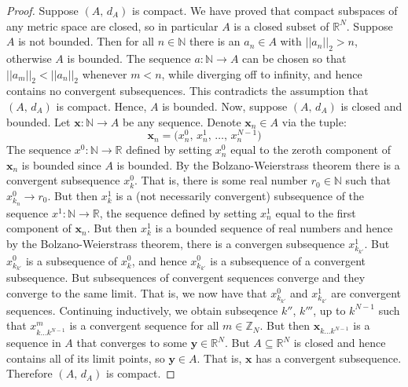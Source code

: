 \documentclass{article}
\theoremstyle{plain}
\theoremstyle{normal}
\begin{document}
        \begin{proof}
            Suppose $(A,\,d_{A})$ is compact. We have proved that compact
            subspaces of any metric space are closed, so in particular
            $A$ is a closed subset of $\mathbb{R}^{N}$. Suppose $A$ is not
            bounded. Then for all $n\in\mathbb{N}$ there is an
            $a_{n}\in{A}$ with $||a_{n}||_{2}>n$, otherwise
            $A$ is bounded. The sequence $a:\mathbb{N}\rightarrow{A}$ can be
            chosen so that $||a_{m}||_{2}<||a_{n}||_{2}$ whenever $m<n$, while
            diverging off to infinity, and hence contains no
            convergent subsequences. This contradicts the assumption that
            $(A,\,d_{A})$ is compact. Hence, $A$ is bounded. Now, suppose
            $(A,\,d_{A})$ is closed and bounded. Let
            $\mathbf{x}:\mathbb{N}\rightarrow{A}$ be any sequence. Denote
            $\mathbf{x}_{n}\in{A}$ via the tuple:
            \begin{equation}
                \mathbf{x}_{n}=\big(x_{n}^{0},\,x_{n}^{1},\,\dots,\,
                    x_{n}^{N-1}\big)
            \end{equation}
            The sequence $x^{0}:\mathbb{N}\rightarrow\mathbb{R}$ defined by
            setting $x_{n}^{0}$ equal to the zeroth component of
            $\mathbf{x}_{n}$ is bounded since $A$ is bounded. By
            the Bolzano-Weierstrass theorem there is a
            convergent subsequence $x_{k}^{0}$. That is, there is some
            real number $r_{0}\in\mathbb{N}$ such that
            $x_{k_{n}}^{0}\rightarrow{r}_{0}$. But then
            $x_{k}^{1}$ is a (not necessarily convergent) subsequence of the
            sequence $x^{1}:\mathbb{N}\rightarrow\mathbb{R}$, the sequence
            defined by setting $x_{n}^{1}$ equal to the first component of
            $\mathbf{x}_{n}$. But then $x_{k}^{1}$ is a bounded sequence of
            real numbers and hence by the Bolzano-Weierstrass theorem, there
            is a convergen subsequence $x_{k_{k'}}^{1}$. But
            $x_{k_{k'}}^{0}$ is a subsequence of $x_{k}^{0}$, and hence
            $x_{k_{k'}}^{0}$ is a subsequence of a convergent subsequence.
            But subsequences of convergent sequences converge and they converge
            to the same limit. That is, we now have that
            $x_{k_{k'}}^{0}$ and $x_{k_{k'}}^{1}$ are convergent sequences.
            Continuing inductively, we obtain subseqence
            $k''$, $k'''$, up to $k^{N-1}$ such that
            $x_{k\dots{k}^{N-1}}^{m}$ is a convergent sequence for all
            $m\in\mathbb{Z}_{N}$. But then
            $\mathbf{x}_{k\dots{k}^{N-1}}$ is a sequence in $A$ that converges
            to some $\mathbf{y}\in\mathbb{R}^{N}$. But
            $A\subseteq\mathbb{R}^{N}$ is closed and hence contains all of its
            limit points, so $\mathbf{y}\in{A}$. That is, $\mathbf{x}$ has a
            convergent subsequence. Therefore $(A,\,d_{A})$ is compact.
        \end{proof}
\end{document}
